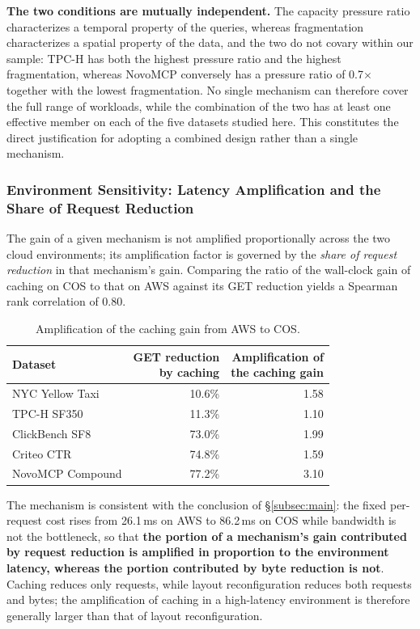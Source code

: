 \textbf{The two conditions are mutually independent.}
The capacity pressure ratio characterizes a temporal property of the queries,
whereas fragmentation characterizes a spatial property of the data, and the two
do not covary within our sample: TPC-H has both the highest pressure ratio and
the highest fragmentation, whereas NovoMCP conversely has a pressure ratio of
0.7$\times$ together with the lowest fragmentation. No single mechanism can
therefore cover the full range of workloads, while the combination of the two
has at least one effective member on each of the five datasets studied here.
This constitutes the direct justification for adopting a combined design rather
than a single mechanism.

\subsubsection{Environment Sensitivity: Latency Amplification and the Share of Request Reduction}

The gain of a given mechanism is not amplified proportionally across the two
cloud environments; its amplification factor is governed by the \emph{share of
request reduction} in that mechanism's gain. Comparing the ratio of the
wall-clock gain of caching on COS to that on AWS against its GET reduction
yields a Spearman rank correlation of 0.80.

\begin{table}[t]
\centering
\caption{Amplification of the caching gain from AWS to COS.}
\label{tab:amplification}
\footnotesize
\begin{tabular}{@{}lrr@{}}
\toprule
Dataset & \makecell[r]{GET reduction\\by caching} &
\makecell[r]{Amplification of\\the caching gain} \\
\midrule
NYC Yellow Taxi  & 10.6\% & 1.58 \\
TPC-H SF350      & 11.3\% & 1.10 \\
ClickBench SF8   & 73.0\% & 1.99 \\
Criteo CTR       & 74.8\% & 1.59 \\
NovoMCP Compound & 77.2\% & 3.10 \\
\bottomrule
\end{tabular}
\end{table}

The mechanism is consistent with the conclusion of \S\ref{subsec:main}: the
fixed per-request cost rises from 26.1\,ms on AWS to 86.2\,ms on COS while
bandwidth is not the bottleneck, so that \textbf{the portion of a mechanism's
gain contributed by request reduction is amplified in proportion to the
environment latency, whereas the portion contributed by byte reduction is not}.
Caching reduces only requests, while layout reconfiguration reduces both
requests and bytes; the amplification of caching in a high-latency environment
is therefore generally larger than that of layout reconfiguration.


